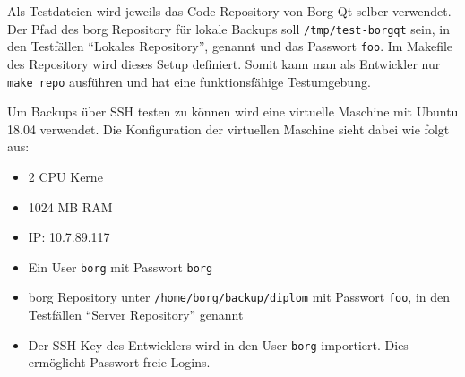 Als Testdateien wird jeweils das Code Repository von Borg-Qt selber verwendet.
Der Pfad des \gls{borg} Repository für lokale Backups soll \texttt{/tmp/test-borgqt}
sein, in den Testfällen "`Lokales Repository"', genannt und das Passwort \texttt{foo}.
Im Makefile des Repository wird dieses Setup definiert. Somit kann man als
Entwickler nur \texttt{make repo} ausführen und hat eine funktionsfähige Testumgebung.

Um Backups über SSH testen zu können wird eine virtuelle Maschine mit Ubuntu
18.04 verwendet. Die Konfiguration der virtuellen Maschine sieht dabei wie
folgt aus:
\begin{itemize}
\item 2 CPU Kerne
\item 1024 MB RAM
\item IP: 10.7.89.117
\item Ein User \texttt{borg} mit Passwort \texttt{borg}
\item \gls{borg} Repository unter \texttt{/home/borg/backup/diplom} mit Passwort \texttt{foo}, in
den Testfällen "`Server Repository"' genannt
\item Der SSH Key des Entwicklers wird in den User \texttt{borg} importiert. Dies
ermöglicht Passwort freie Logins.
\end{itemize}

